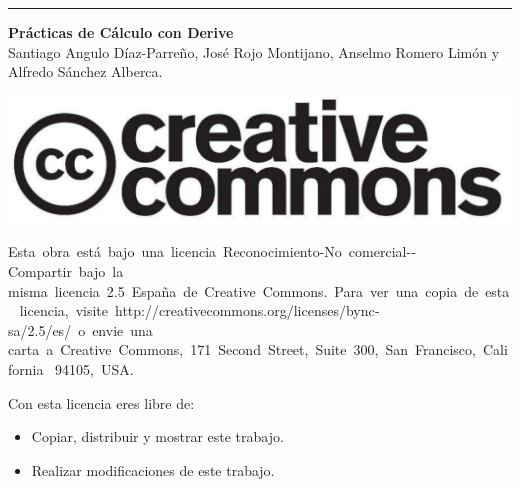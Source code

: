 \begin{titlepage}
\null
\vfill
\hrule depth 3pt
\smallskip
\sffamily

\noindent \textbf{Prácticas de Cálculo con Derive}\\
Santiago Angulo Díaz-Parreño, José Rojo Montijano, Anselmo Romero Limón y Alfredo Sánchez Alberca.

\bigskip
\begin{center}
\includegraphics[scale=0.1]{img/cc-logo}
\end{center}

\small
Esta obra está bajo una licencia Reconocimiento­-No comercial-­Compartir bajo la 
misma licencia 2.5 España de Creative Commons. Para ver una copia de esta 
licencia, visite http://creativecommons.org/licenses/by­nc­sa/2.5/es/ o envie una 
carta a Creative Commons, 171 Second Street, Suite 300, San Francisco, California 
94105, USA.

\medskip
Con esta licencia eres libre de:
\begin{itemize}
\item Copiar, distribuir y mostrar este trabajo.
\item Realizar modificaciones de este trabajo.
\end{itemize}


\end{titlepage}
